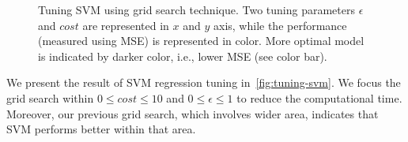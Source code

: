 	\begin{figure}[H]
		\begin{adjustwidth}{-3cm}{}
		\centering
		\end{adjustwidth}
		\caption[Tuning \ac{SVM}.]
		{Tuning \ac{SVM} using grid search technique. Two tuning parameters $\epsilon$ and $cost$ are represented in $x$ and $y$ axis, while the performance (measured using \ac{MSE}) is represented in color. More optimal model is indicated by darker color, i.e., lower \ac{MSE} (see color bar).}
		\label{fig:tuning-svm}
	\end{figure}

	We present the result of \ac{SVM} regression tuning in~\autoref{fig:tuning-svm}.
	We focus the grid search within $0 \le cost \le 10$ and $0 \le \epsilon \le 1$ to reduce the computational time. Moreover, our previous grid search, which involves wider area, indicates that \ac{SVM} performs better within that area.


